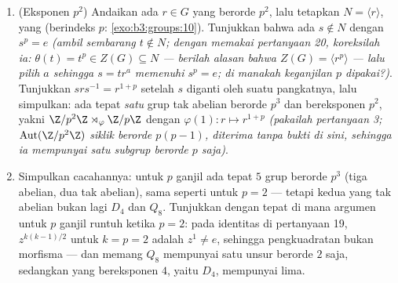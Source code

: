 \begin{problem}
\begin{enumerate}[resume]
        $N^3 = 0$ dan $p \geq 3$): setiap grup tak abelian bereksponen-$p$
        berorde $p^3$ isomorfik dengan $H_p$.
  \item (Eksponen $p^2$) Andaikan ada $r \in G$ yang berorde $p^2$,
        lalu tetapkan $N = \langle r\rangle$, yang  (berindeks $p$:
        \cref{exo:b3:groups:10}). Tunjukkan bahwa ada $s \notin N$ dengan
        $s^p = e$ \emph{(ambil sembarang $t \notin N$; dengan memakai pertanyaan
        20, koreksilah ia: $\theta(t) = t^p \in Z(G) \subseteq N$
        --- berilah alasan bahwa $Z(G) = \langle r^p\rangle$ --- lalu pilih $a$
        sehingga $s = tr^{a}$ memenuhi $s^p = e$; di manakah keganjilan $p$
        dipakai?)}. Tunjukkan $srs^{-1} = r^{1+p}$ setelah $s$ diganti
        oleh suatu pangkatnya, lalu simpulkan: ada tepat \emph{satu}
        grup tak abelian berorde $p^3$ dan bereksponen $p^2$,
        yakni $\Z/p^2\Z \rtimes_\varphi \Z/p\Z$ dengan
        $\varphi(1)\colon r \mapsto r^{1+p}$ \emph{(pakailah pertanyaan
        3; $\operatorname{Aut}(\Z/p^2\Z)$ siklik berorde
        $p(p-1)$, diterima tanpa bukti di sini, sehingga ia mempunyai satu subgrup
        berorde $p$ saja)}.
  \item Simpulkan cacahannya: untuk $p$ ganjil ada tepat $5$
        grup berorde $p^3$ (tiga abelian, dua tak abelian),
        sama seperti untuk $p = 2$ --- tetapi kedua yang tak abelian
        bukan lagi $D_4$ dan $Q_8$. Tunjukkan dengan tepat di mana
        argumen untuk $p$ ganjil runtuh ketika $p = 2$: pada identitas di
        pertanyaan 19, $z^{k(k-1)/2}$ untuk $k = p = 2$ adalah $z^1 \neq
        e$, sehingga pengkuadratan bukan morfisma --- dan memang $Q_8$
        mempunyai satu unsur berorde $2$ saja, sedangkan yang
        bereksponen $4$, yaitu $D_4$, mempunyai lima.
\end{enumerate}


\end{problem}
